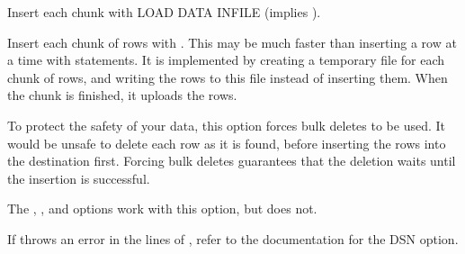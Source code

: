 \documentclass[letterpaper,10pt,english]{sphinxmanual}
\begin{document}
\begin{fulllineitems}
\label{\detokenize{mariadb-archiver:cmdoption-mariadb-archiver-bulk-insert}}
\sphinxAtStartPar
Insert each chunk with LOAD DATA INFILE (implies {\hyperref[\detokenize{mariadb-archiver:cmdoption-mariadb-archiver-bulk-delete}]{}} {\hyperref[\detokenize{mariadb-archiver:cmdoption-mariadb-archiver-commit-each}]{}}).

\sphinxAtStartPar
Insert each chunk of rows with .  This may be much
faster than inserting a row at a time with  statements.  It is
implemented by creating a temporary file for each chunk of rows, and writing the
rows to this file instead of inserting them.  When the chunk is finished, it
uploads the rows.

\sphinxAtStartPar
To protect the safety of your data, this option forces bulk deletes to be used.
It would be unsafe to delete each row as it is found, before inserting the rows
into the destination first.  Forcing bulk deletes guarantees that the deletion
waits until the insertion is successful.

\sphinxAtStartPar
The {\hyperref[\detokenize{mariadb-archiver:cmdoption-mariadb-archiver-low-priority-insert}]{}}, {\hyperref[\detokenize{mariadb-archiver:cmdoption-mariadb-archiver-replace}]{}}, and {\hyperref[\detokenize{mariadb-archiver:cmdoption-mariadb-archiver-ignore}]{}} options work
with this option, but {\hyperref[\detokenize{mariadb-archiver:cmdoption-mariadb-archiver-delayed-insert}]{}} does not.

\sphinxAtStartPar
If  throws an error in the lines of , refer to the documentation
for the  DSN option.

\end{fulllineitems}
\end{document}
